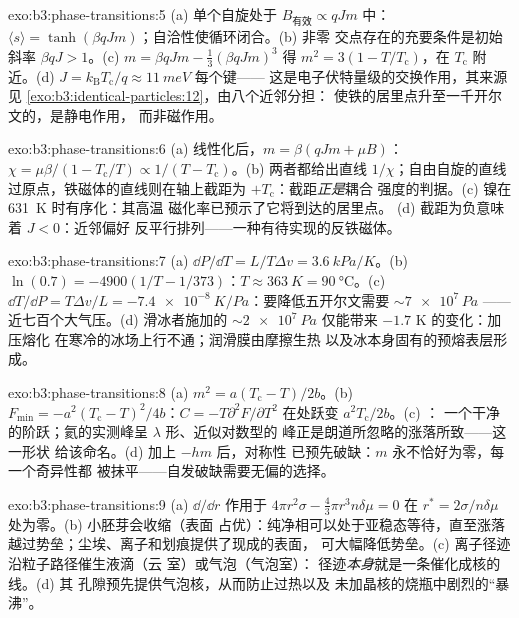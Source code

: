 \begin{solution}{exo:b3:phase-transitions:5}
(a) 单个自旋处于 $B_{\text{有效}} \propto qJm$ 中：$\langle s\rangle =
\tanh(\beta qJm)$；自洽性使循环闭合。(b) 非零
交点存在的充要条件是初始斜率 $\beta qJ > 1$。(c) $m =
\beta qJm - \tfrac13(\beta qJm)^3$ 得 $m^2 = 3(1 -
T/T_{\text{c}})$，在 $T_{\text{c}}$ 附近。(d) $J =
k_{\text{B}}T_{\text{c}}/q \approx \qty{11}{meV}$ 每个键——
这是电子伏特量级的交换作用，其来源见
\cref{exo:b3:identical-particles:12}，由八个近邻分担：
使铁的居里点升至一千开尔文的，是静电作用，
而非磁作用。
\end{solution}

\begin{solution}{exo:b3:phase-transitions:6}
(a) 线性化后，$m = \beta(qJm + \mu B)$：$\chi =
\mu\beta/(1 - T_{\text{c}}/T) \propto 1/(T - T_{\text{c}})$。(b)
两者都给出直线 $1/\chi$；自由自旋的直线
过原点，铁磁体的直线则在轴上截距为
$+T_{\text{c}}$：截距\emph{正是}耦合
强度的判据。(c) 镍在 \qty{631}{K} 时有序化：其高温
磁化率已预示了它将到达的居里点。
(d) 截距为负意味着 $J < 0$：近邻偏好
反平行排列——一种有待实现的反铁磁体。
\end{solution}

\begin{solution}{exo:b3:phase-transitions:7}
(a) $\dd P/\dd T = L/T\Delta v = \qty{3.6}{kPa/K}$。(b)
$\ln(0.7) = -4900(1/T - 1/373)$：$T \approx \qty{363}{K} =
\qty{90}{\celsius}$。(c) $\dd T/\dd P = T\Delta v/L =
\qty{-7.4e-8}{K/Pa}$：要降低五开尔文需要 $\sim\num{7e7}\,\unit{Pa}$
——近七百个大气压。(d) 滑冰者施加的
$\sim\qty{2e7}{Pa}$ 仅能带来 $-1.7$ K 的变化：加压熔化
在寒冷的冰场上行不通；润滑膜由摩擦生热
以及冰本身固有的预熔表层形成。
\end{solution}

\begin{solution}{exo:b3:phase-transitions:8}
(a) $m^2 = a(T_{\text{c}} - T)/2b$。(b) $F_{\min} =
-a^2(T_{\text{c}} - T)^2/4b$：$C = -T\partial^2F/\partial T^2$
在处跃变 $a^2T_{\text{c}}/2b$。(c) ：
一个干净的阶跃；氦的实测峰呈 $\lambda$ 形、近似对数型的
峰正是朗道所忽略的涨落所致——这一形状
给该命名。(d) 加上 $-hm$ 后，对称性
已预先破缺：$m$ 永不恰好为零，每一个奇异性都
被抹平——自发破缺需要无偏的选择。
\end{solution}

\begin{solution}{exo:b3:phase-transitions:9}
(a) $\dd/\dd r$ 作用于 $4\pi r^2\sigma - \tfrac43\pi r^3n\delta\mu = 0$
在 $r^* = 2\sigma/n\delta\mu$ 处为零。(b) 小胚芽会收缩（表面
占优）：纯净相可以处于亚稳态等待，直至涨落
越过势垒；尘埃、离子和划痕提供了现成的表面，
可大幅降低势垒。(c) 离子径迹沿粒子路径催生液滴（云
室）或气泡（气泡室）：
径迹\emph{本身}就是一条催化成核的线。(d) 其
孔隙预先提供气泡核，从而防止过热以及
未加晶核的烧瓶中剧烈的“暴沸”。
\end{solution}

